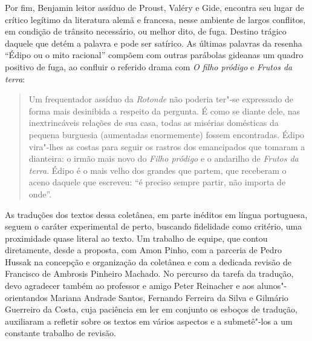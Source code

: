 Por fim, Benjamin leitor assíduo de Proust, Valéry e Gide, encontra seu
lugar de crítico legítimo da literatura alemã e francesa, nesse ambiente
de largos conflitos, em condição de trânsito necessário, ou melhor dito,
de fuga. Destino trágico daquele que detém a palavra e pode ser
satírico. As últimas palavras da resenha ``Édipo ou o mito racional''
compõem com outras parábolas gideanas um quadro positivo de fuga, ao
confluir o referido drama com \emph{O filho pródigo} e \emph{Frutos da
terra}:

\begin{quote}
Um frequentador assíduo da \emph{Rotonde} não poderia ter"-se expressado
de forma mais desinibida a respeito da pergunta. É como se diante dele,
nas inextrincáveis relações de sua casa, todas as misérias domésticas da
pequena burguesia (aumentadas enormemente) fossem encontradas. Édipo
vira"-lhes as costas para seguir os rastros dos emancipados que tomaram a
dianteira: o irmão mais novo do \emph{Filho pródigo} e o andarilho de
\emph{Frutos da terra}. Édipo é o mais velho dos grandes que partem, que
receberam o aceno daquele que escreveu: ``é preciso sempre partir, não
importa de onde''.
\end{quote}

\asterisc

As traduções dos textos dessa coletânea, em parte inéditos em língua
portuguesa, seguem o caráter experimental de perto, buscando fidelidade
como critério, uma proximidade quase literal ao texto. Um trabalho de
equipe, que contou diretamente, desde a proposta, com Amon Pinho, com a
parceria de Pedro Hussak na concepção e organização da coletânea e com a
dedicada revisão de Francisco de Ambrosis Pinheiro Machado. No percurso
da tarefa da tradução, devo agradecer também ao professor e amigo Peter
Reinacher e aos alunos"-orientandos Mariana Andrade Santos, Fernando
Ferreira da Silva e Gilmário Guerreiro da Costa, cuja paciência em ler
em conjunto os esboços de tradução, auxiliaram a refletir sobre os
textos em vários aspectos e a submetê"-los a um constante trabalho de
revisão.
